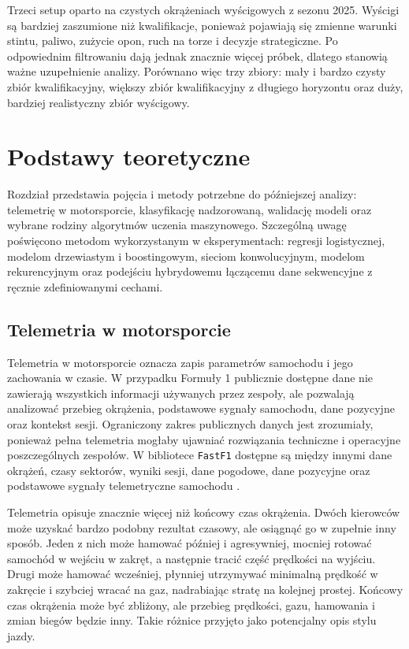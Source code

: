 \documentclass[printmode,pl]{mgr}
\begin{document}
Trzeci setup oparto na czystych okrążeniach wyścigowych z sezonu 2025. Wyścigi są bardziej zaszumione niż kwalifikacje, ponieważ pojawiają się zmienne warunki stintu, paliwo, zużycie opon, ruch na torze i decyzje strategiczne. Po odpowiednim filtrowaniu dają jednak znacznie więcej próbek, dlatego stanowią ważne uzupełnienie analizy. Porównano więc trzy zbiory: mały i bardzo czysty zbiór kwalifikacyjny, większy zbiór kwalifikacyjny z długiego horyzontu oraz duży, bardziej realistyczny zbiór wyścigowy.


\chapter{Podstawy teoretyczne}

Rozdział przedstawia pojęcia i metody potrzebne do późniejszej analizy: telemetrię w motorsporcie, klasyfikację nadzorowaną, walidację modeli oraz wybrane rodziny algorytmów uczenia maszynowego. Szczególną uwagę poświęcono metodom wykorzystanym w eksperymentach: regresji logistycznej, modelom drzewiastym i boostingowym, sieciom konwolucyjnym, modelom rekurencyjnym oraz podejściu hybrydowemu łączącemu dane sekwencyjne z ręcznie zdefiniowanymi cechami.


\section{Telemetria w motorsporcie}

Telemetria w motorsporcie oznacza zapis parametrów samochodu i jego zachowania w czasie. W przypadku Formuły 1 publicznie dostępne dane nie zawierają wszystkich informacji używanych przez zespoły, ale pozwalają analizować przebieg okrążenia, podstawowe sygnały samochodu, dane pozycyjne oraz kontekst sesji. Ograniczony zakres publicznych danych jest zrozumiały, ponieważ pełna telemetria mogłaby ujawniać rozwiązania techniczne i operacyjne poszczególnych zespołów. W bibliotece \texttt{FastF1} dostępne są między innymi dane okrążeń, czasy sektorów, wyniki sesji, dane pogodowe, dane pozycyjne oraz podstawowe sygnały telemetryczne samochodu \cite{fastf1_docs}.

Telemetria opisuje znacznie więcej niż końcowy czas okrążenia. Dwóch kierowców może uzyskać bardzo podobny rezultat czasowy, ale osiągnąć go w zupełnie inny sposób. Jeden z nich może hamować później i agresywniej, mocniej rotować samochód w wejściu w zakręt, a następnie tracić część prędkości na wyjściu. Drugi może hamować wcześniej, płynniej utrzymywać minimalną prędkość w zakręcie i szybciej wracać na gaz, nadrabiając stratę na kolejnej prostej. Końcowy czas okrążenia może być zbliżony, ale przebieg prędkości, gazu, hamowania i zmian biegów będzie inny. Takie różnice przyjęto jako potencjalny opis stylu jazdy.
\end{document}
